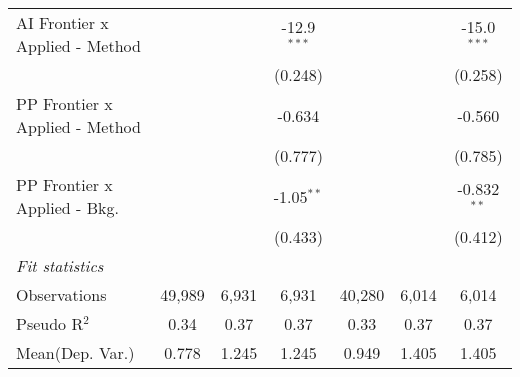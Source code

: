 \begin{tabular}{lcccccc}
   AI Frontier x Applied - Method &                &                & -12.9$^{***}$ &                &                & -15.0$^{***}$\\   
                                  &                &                & (0.248)       &                &                & (0.258)\\   
   PP Frontier x Applied - Method &                &                & -0.634        &                &                & -0.560\\   
                                  &                &                & (0.777)       &                &                & (0.785)\\   
   PP Frontier x Applied - Bkg.   &                &                & -1.05$^{**}$  &                &                & -0.832$^{**}$\\   
                                  &                &                & (0.433)       &                &                & (0.412)\\   
   \midrule
   \emph{Fit statistics}\\
   Observations                   & 49,989         & 6,931          & 6,931         & 40,280         & 6,014          & 6,014\\  
   Pseudo R$^2$                   & 0.34           & 0.37           & 0.37          & 0.33           & 0.37           & 0.37\\  
Mean(Dep. Var.) & 0.778 & 1.245 & 1.245 & 0.949 & 1.405 & 1.405 \\
   

\end{tabular}

